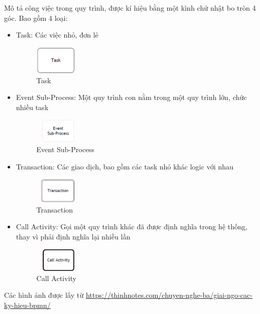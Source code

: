 Mô tả công việc trong quy trình, được kí hiệu bằng một kình chử nhật bo tròn 4 góc. Bao gồm 4 loại:
\begin{itemize}
	\item Task: Các việc nhỏ, đơn lẻ
	      \begin{figure}[!htp]
		      \begin{center}
			      \includegraphics[width=2cm]{img/theory/BPMN/Task.png}
		      \end{center}
		      \caption{Task}
	      \end{figure}
	\item Event Sub-Process: Một quy trình con nằm trong một quy trình lớn, chức nhiều task
	      \begin{figure}[!htp]
		      \begin{center}
			      \includegraphics[width=2cm]{img/theory/BPMN/Event Sub-process.png}
		      \end{center}
		      \caption{Event Sub-Process}
	      \end{figure}
	\item Transaction: Các giao dịch, bao gồm các task nhỏ khác logic với nhau
	      \begin{figure}[!htp]
		      \begin{center}
			      \includegraphics[width=2cm]{img/theory/BPMN/Transaction.png}
		      \end{center}
		      \caption{Transaction}
	      \end{figure}
	\item Call Activity: Gọi một quy trình khác đã được định nghĩa trong hệ thống, thay vì phải định nghĩa lại nhiều lần
	      \begin{figure}[!htp]

		      \begin{center}
			      \includegraphics[width=2cm]{img/theory/BPMN/Call Activity.png}
		      \end{center}
		      \caption{Call Activity}
	      \end{figure}
\end{itemize}
\begin{flushleft}
	Các hình ảnh được lấy từ \url{https://thinhnotes.com/chuyen-nghe-ba/giai-ngo-cac-ky-hieu-bpmn/}
\end{flushleft}


